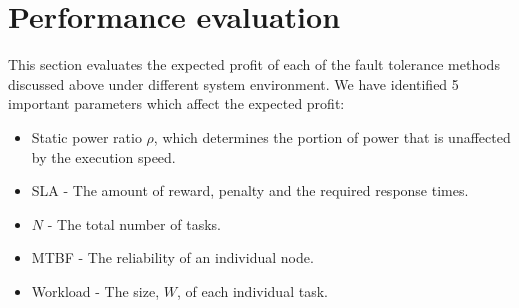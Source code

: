%
%
%

\section{Performance evaluation}

This section evaluates the expected profit of each of the fault tolerance
methods discussed above under different system environment. We have identified 5
important parameters which affect the expected profit:
\begin{itemize}
\item Static power ratio $\rho$, which determines the portion of power that is unaffected by the execution speed.
\item SLA - The amount of reward, penalty and the required response times.
\item $N$ - The total number of tasks.
\item MTBF - The reliability of an individual node.
\item Workload - The size, $W$, of each individual task.
\end{itemize}


